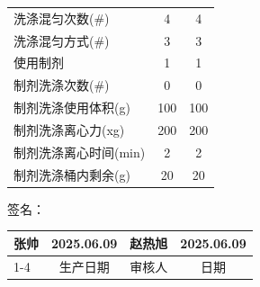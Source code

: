 \documentclass[UTF8,10pt,a4paper,fontset=fandol]{ctexart}
\newcommand{\fieldvalue}[1]{#1}
\newcommand{\handwritten}[1]{#1}
\begin{document}
\begin{tabularx}{\textwidth}{@{}>{\raggedright\arraybackslash}Xcc@{}}
洗涤混匀次数(\#) &
\fieldvalue{4} &
\fieldvalue{4} \\

洗涤混匀方式(\#) &
\fieldvalue{3} &
\fieldvalue{3} \\

使用制剂 &
\fieldvalue{1} &
\fieldvalue{1} \\

制剂洗涤次数(\#) &
\fieldvalue{0} &
\fieldvalue{0} \\

制剂洗涤使用体积(g) &
\fieldvalue{100} &
\fieldvalue{100} \\

制剂洗涤离心力(xg) &
\fieldvalue{200} &
\fieldvalue{200} \\

制剂洗涤离心时间(min) &
\fieldvalue{2} &
\fieldvalue{2} \\

制剂洗涤桶内剩余(g) &
\fieldvalue{20} &
\fieldvalue{20}
\end{tabularx}

\vspace{1.5em}

签名：

\begin{tabularx}{\textwidth}{@{}XXXX@{}}
\centering
\fieldvalue{\handwritten{张帅}}
&
\centering
\fieldvalue{\handwritten{2025.06.09}}
&
\centering
\fieldvalue{\handwritten{赵热旭}}
&
\centering
\fieldvalue{\handwritten{2025.06.09}}
\arraybackslash \\[-0.3em]
\cline{1-4}
\multicolumn{1}{c}{生产人} &
\multicolumn{1}{c}{生产日期} &
\multicolumn{1}{c}{审核人} &
\multicolumn{1}{c}{日期} \\
\end{tabularx}
\end{document}
